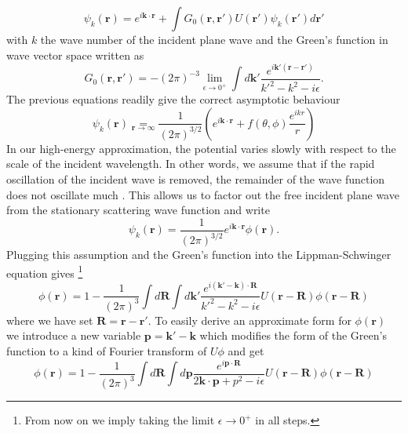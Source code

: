 \documentclass[11pt]{article}
\numberwithin{equation}{section}
\begin{document}
\begin{equation}
	\psi_k(\mathbf{r}) = e^{i \mathbf{k}\cdot \mathbf{r}} + \int G_0(\mathbf{r},\mathbf{r}')U(\mathbf{r}')\psi_k(\mathbf{r}')d\mathbf{r}'
\end{equation}
with $k$ the wave number of the incident plane wave and the Green's function in wave vector space written as
\begin{equation}
	G_0(\mathbf{r},\mathbf{r}') = - (2\pi)^{-3} \underset{\epsilon \rightarrow 0^+} \lim \int d\mathbf{k}' \frac{e^{i \mathbf{k}' (\mathbf{r}-\mathbf{r}')}}{k'^2 - k^2 - i\epsilon}.
\end{equation}
The previous equations readily give the correct asymptotic behaviour
\begin{equation}\label{AsymptoticBehaviour}
\psi_k(\mathbf{r}) \underset{\mathbf{r} \rightarrow \infty} = \frac{1}{(2\pi)^{3/2}} \left( e^{i \mathbf{k}\cdot \mathbf{r}} + f(\theta, \phi) \frac{e^{ikr}}{r}\right)	
\end{equation}
In our high-energy approximation, the potential varies slowly with respect to the scale of the incident wavelength. In other words, we assume that if the rapid oscillation of the incident wave is removed, the remainder of the wave function does not oscillate much \cite{Suzuki03}. This allows us  to factor out the free incident plane wave from the stationary scattering wave function and write
\begin{equation}\label{ansatz}
	\psi_k(\mathbf{r}) = \frac{1}{(2\pi)^{3/2}}e^{i\mathbf{k}\cdot \mathbf{r}}\phi(\mathbf{r}).
\end{equation}
Plugging this assumption and the Green's function into the Lippman-Schwinger equation gives \footnote{From now on we imply taking the limit $\epsilon \rightarrow 0^+$ in all steps.}
\begin{equation}
	\phi(\mathbf{r}) = 1 - \frac{1}{(2\pi)^{3}}\int d\mathbf{R} \int d\mathbf{k}' \frac{e^{i(\mathbf{k}' - \mathbf{k}) \cdot \mathbf{R}}}{k'^2 - k^2 - i\epsilon} U(\mathbf{r} - \mathbf{R})\phi(\mathbf{r} - \mathbf{R})
\end{equation}
where we have set $\mathbf{R} = \mathbf{r} - \mathbf{r}'$. To easily derive an approximate form for $\phi(\mathbf{r})$ we introduce a new variable $\mathbf{p} = \mathbf{k}' - \mathbf{k}$ which modifies the form of the Green's function to a kind of Fourier transform of $U\phi$ and get
\begin{equation} \label{SlowVaryingIntegral}
	\phi(\mathbf{r}) = 1 - \frac{1}{(2\pi)^3}\int d\mathbf{R} \int d\mathbf{p} \frac{e^{i\mathbf{p} \cdot \mathbf{R}}}{2 \mathbf{k}\cdot \mathbf{p} + p^2 - i\epsilon} U(\mathbf{r} - \mathbf{R})\phi(\mathbf{r} - \mathbf{R})
\end{equation}
\end{document}
